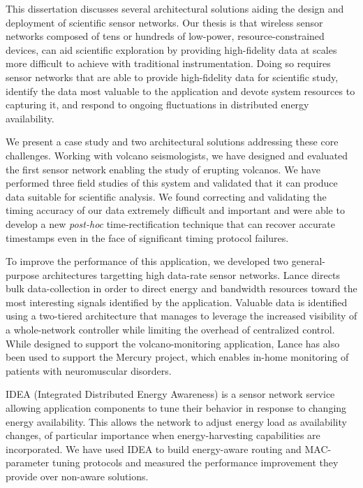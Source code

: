 \hspace{0.25in}This dissertation discusses several architectural solutions aiding the design
and deployment of scientific sensor networks. Our thesis is that wireless
sensor networks composed of tens or hundreds of low-power,
resource-constrained devices, can aid scientific exploration by providing
high-fidelity data at scales more difficult to achieve with traditional
instrumentation. Doing so requires sensor networks that are able to provide
high-fidelity data for scientific study, identify the data most valuable to
the application and devote system resources to capturing it, and respond to
ongoing fluctuations in distributed energy availability.

We present a case study and two architectural solutions addressing these core
challenges. Working with volcano seismologists, we have designed and
evaluated the first sensor network enabling the study of erupting volcanos.
We have performed three field studies of this system and validated that it
can produce data suitable for scientific analysis. We found correcting and
validating the timing accuracy of our data extremely difficult and important
and were able to develop a new \textit{post-hoc} time-rectification technique
that can recover accurate timestamps even in the face of significant timing
protocol failures.

To improve the performance of this application, we developed two
general-purpose architectures targetting high data-rate sensor networks.
Lance directs bulk data-collection in order to direct energy and bandwidth
resources toward the most interesting signals identified by the application.
Valuable data is identified using a two-tiered architecture that manages to
leverage the increased visibility of a whole-network controller while
limiting the overhead of centralized control. While designed to support the
volcano-monitoring application, Lance has also been used to support the
Mercury project, which enables in-home monitoring of patients with
neuromuscular disorders. 

IDEA (Integrated Distributed Energy Awareness) is a sensor network service
allowing application components to tune their behavior in response to
changing energy availability. This allows the network to adjust energy load
as availability changes, of particular importance when energy-harvesting
capabilities are incorporated. We have used IDEA to build energy-aware
routing and MAC-parameter tuning protocols and measured the performance
improvement they provide over non-aware solutions.
